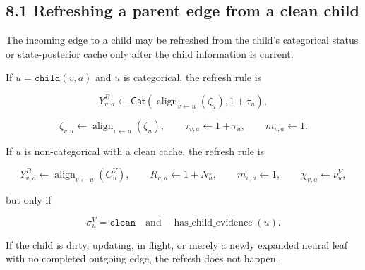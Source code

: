\documentclass[11pt]{article}
\newcommand{\Align}{\operatorname{align}}
\newcommand{\CatObj}{\mathsf{Cat}}
\begin{document}
\subsection*{8.1 Refreshing a parent edge from a clean child}

The incoming edge to a child may be refreshed from the child's categorical
status or state-posterior cache only after the child information is current.

If \(u=\texttt{child}(v,a)\) and \(u\) is categorical, the refresh rule is

\[
Y^B_{v,a}
\gets
\CatObj(\Align_{v\leftarrow u}(\zeta_u),1+\tau_u),
\]

\[
\zeta_{v,a}
\gets
\Align_{v\leftarrow u}(\zeta_u),
\qquad
\tau_{v,a}\gets 1+\tau_u,
\qquad
m_{v,a}\gets1.
\]

If \(u\) is non-categorical with a clean cache, the refresh rule is

\[
Y^B_{v,a}
\gets
\Align_{v\leftarrow u}(C^V_u),
\qquad
R_{v,a}\gets 1+N^\downarrow_u,
\qquad
m_{v,a}\gets 1,
\qquad
\chi_{v,a}\gets \nu^V_u,
\]

but only if

\[
\sigma^V_u=\texttt{clean}
\quad\text{and}\quad
\operatorname{has\_child\_evidence}(u).
\]

If the child is dirty, updating, in flight, or merely a newly expanded neural
leaf with no completed outgoing edge, the refresh does not happen.
\end{document}
